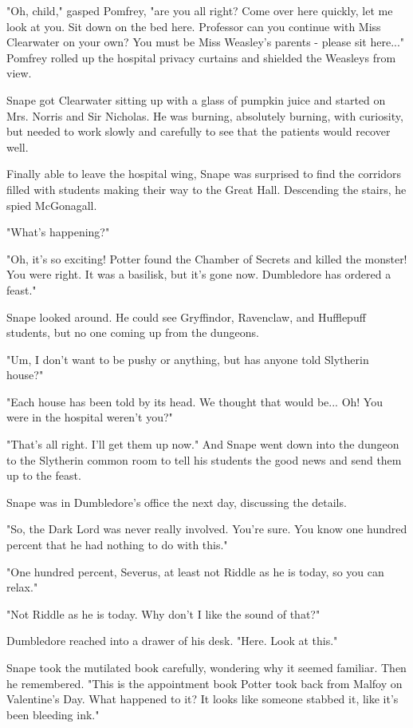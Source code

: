 \documentclass[a4paper,11pt]{article}
\begin{document}
"Oh, child," gasped Pomfrey, "are you all right? Come over here quickly, let me look at you. Sit down on the bed here. Professor can you continue with Miss Clearwater on your own? You must be Miss Weasley's parents - please sit here..." Pomfrey rolled up the hospital privacy curtains and shielded the Weasleys from view.

Snape got Clearwater sitting up with a glass of pumpkin juice and started on Mrs. Norris and Sir Nicholas. He was burning, absolutely burning, with curiosity, but needed to work slowly and carefully to see that the patients would recover well.

Finally able to leave the hospital wing, Snape was surprised to find the corridors filled with students making their way to the Great Hall. Descending the stairs, he spied McGonagall.

"What's happening?"

"Oh, it's so exciting! Potter found the Chamber of Secrets and killed the monster! You were right. It was a basilisk, but it's gone now. Dumbledore has ordered a feast."

Snape looked around. He could see Gryffindor, Ravenclaw, and Hufflepuff students, but no one coming up from the dungeons.

"Um, I don't want to be pushy or anything, but has anyone told Slytherin house?"

"Each house has been told by its head. We thought that would be... Oh! You were in the hospital weren't you?"

"That's all right. I'll get them up now." And Snape went down into the dungeon to the Slytherin common room to tell his students the good news and send them up to the feast.

Snape was in Dumbledore's office the next day, discussing the details.

"So, the Dark Lord was never really involved. You're sure. You know one hundred percent that he had nothing to do with this."

"One hundred percent, Severus, at least not Riddle as he is today, so you can relax."

"Not Riddle as he is today. Why don't I like the sound of that?"

Dumbledore reached into a drawer of his desk. "Here. Look at this."

Snape took the mutilated book carefully, wondering why it seemed familiar. Then he remembered. "This is the appointment book Potter took back from Malfoy on Valentine's Day. What happened to it? It looks like someone stabbed it, like it's been bleeding ink."
\end{document}
